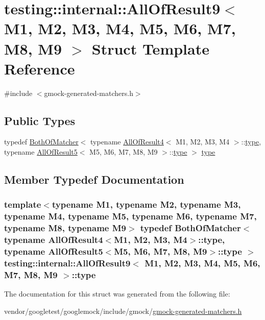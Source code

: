 \hypertarget{structtesting_1_1internal_1_1AllOfResult9}{}\section{testing\+:\+:internal\+:\+:All\+Of\+Result9$<$ M1, M2, M3, M4, M5, M6, M7, M8, M9 $>$ Struct Template Reference}
\label{structtesting_1_1internal_1_1AllOfResult9}


{\ttfamily \#include $<$gmock-\/generated-\/matchers.\+h$>$}

\subsection*{Public Types}
\begin{DoxyCompactItemize}
\item 
typedef \hyperlink{classtesting_1_1internal_1_1BothOfMatcher}{Both\+Of\+Matcher}$<$ typename \hyperlink{structtesting_1_1internal_1_1AllOfResult4}{All\+Of\+Result4}$<$ M1, M2, M3, M4 $>$\+::\hyperlink{structtesting_1_1internal_1_1AllOfResult9_ade56e18d2e0b745968b87fc394710edc}{type}, typename \hyperlink{structtesting_1_1internal_1_1AllOfResult5}{All\+Of\+Result5}$<$ M5, M6, M7, M8, M9 $>$\+::\hyperlink{structtesting_1_1internal_1_1AllOfResult9_ade56e18d2e0b745968b87fc394710edc}{type} $>$ \hyperlink{structtesting_1_1internal_1_1AllOfResult9_ade56e18d2e0b745968b87fc394710edc}{type}
\end{DoxyCompactItemize}


\subsection{Member Typedef Documentation}
\subsubsection[{\texorpdfstring{type}{type}}]{\setlength{\rightskip}{0pt plus 5cm}template$<$typename M1, typename M2, typename M3, typename M4, typename M5, typename M6, typename M7, typename M8, typename M9$>$ typedef {\bf Both\+Of\+Matcher}$<$ typename {\bf All\+Of\+Result4}$<$M1, M2, M3, M4$>$\+::{\bf type}, typename {\bf All\+Of\+Result5}$<$M5, M6, M7, M8, M9$>$\+::{\bf type} $>$ {\bf testing\+::internal\+::\+All\+Of\+Result9}$<$ M1, M2, M3, M4, M5, M6, M7, M8, M9 $>$\+::{\bf type}}\hypertarget{structtesting_1_1internal_1_1AllOfResult9_ade56e18d2e0b745968b87fc394710edc}{}\label{structtesting_1_1internal_1_1AllOfResult9_ade56e18d2e0b745968b87fc394710edc}


The documentation for this struct was generated from the following file\+:\begin{DoxyCompactItemize}
\item 
vendor/googletest/googlemock/include/gmock/\hyperlink{gmock-generated-matchers_8h}{gmock-\/generated-\/matchers.\+h}\end{DoxyCompactItemize}
